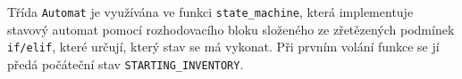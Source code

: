



Třída \texttt{Automat} je využívána ve funkci \texttt{state\_machine}, která implementuje stavový automat pomocí rozhodovacího bloku složeného ze zřetězených podmínek \texttt{if/elif}, které určují, který stav se má vykonat. Při prvním volání funkce se jí předá počáteční stav \texttt{STARTING\_INVENTORY}. 

